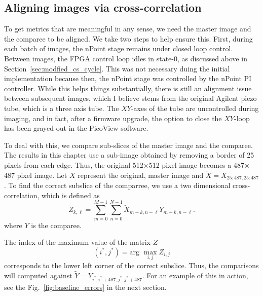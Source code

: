 \documentclass[11pt]{article}
\begin{document}
\subsection{Aligning images via cross-correlation}
To get metrics that are meaningful in any sense, we need the master image and the comparee to be aligned.
We take two steps to help ensure this.
First, during each batch of images, the nPoint stage remains under closed loop control.
Between images, the FPGA control loop idles in state-0, as discussed above in Section~\ref{sec:modfied_cs_cycle}.
This was not necessary duing the initial implementation because then, the nPoint stage was controlled by the nPoint PI controller.
While this helps things substantially, there is still an alignment issue between subsequent images, which I believe stems from the original Agilent piezo tube, which is a three axis tube.
The $XY$-axes of the tube are uncontrolled during imaging, and in fact, after a firmware upgrade, the option to close the $XY$-loop has been grayed out in the PicoView software.

To deal with this, we compare sub-slices of the master image and the comparee. The results in this chapter use a sub-image obtained by removing a border of 25 pixels from each edge. Thus, the original 512$\times$512 pixel image becomes a 487$\times$487 pixel image. Let $X$ represent the original, master image and
${\tilde X=X_{25:487, 25:487}}$. To find the correct subslice of the comparree, we use a two dimensional cross-correlation, which is defined as
\begin{equation}
  Z_{k,\ell} = \sum_{m=0}^{M-1}\sum_{n=0}^{N-1} \tilde{X}_{m-k, n-\ell}Y_{m-k, n-\ell}.
\end{equation}
where $Y$ is the comparee.

The index of the maximum value of the matrix $Z$
\begin{equation}
(i^*,j^*) = \textrm{arg~} \max_{i,j}Z_{i,j}
\end{equation}
corresponds to the lower left corner of the correct subslice. Thus, the comparisons will computed against
$\tilde{Y} = Y_{i^*:i^*+487, j^*:j^*+487}$. For an example of this in action, see the Fig.~\ref{fig:baseline_errors} in the next section.
\end{document}
